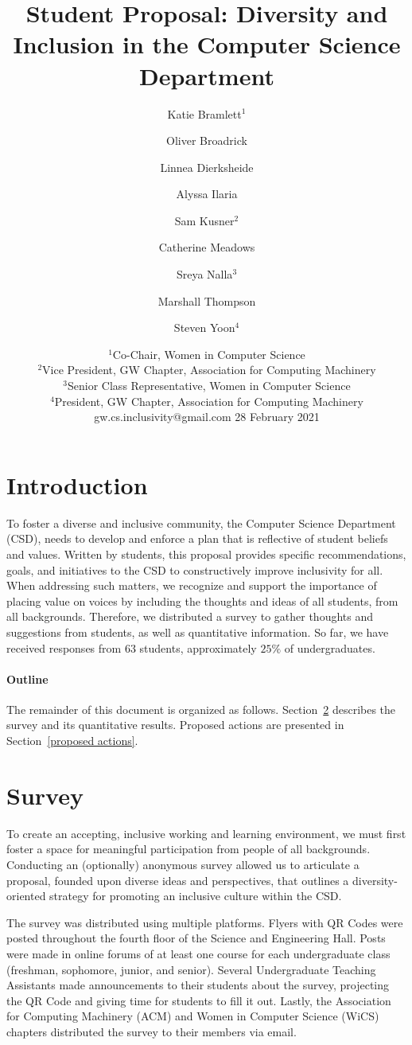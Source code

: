 \documentclass{article}
\title{Student Proposal: Diversity and Inclusion in the Computer Science Department}
\author{
Katie Bramlett$^1$\and
Oliver Broadrick\and
Linnea Dierksheide\and
Alyssa Ilaria\and
Sam Kusner$^2$\and
Catherine Meadows\and
Sreya Nalla$^3$\and
Marshall Thompson\and
Steven Yoon$^4$
}
\date{%
    $^1$Co-Chair, Women in Computer Science\\
    $^2$Vice President, GW Chapter, Association for Computing Machinery\\
    $^3$Senior Class Representative, Women in Computer Science\\
    $^4$President, GW Chapter, Association for Computing Machinery\\
    gw.cs.inclusivity@gmail.com
    28 February 2021
}
\begin{document}
\maketitle


\section{Introduction}
To foster a diverse and inclusive community, the Computer Science Department (CSD), 
needs to develop and enforce a plan that is reflective of student beliefs and values.
Written by students, this proposal
provides specific recommendations, goals, and initiatives
to the CSD to constructively improve
inclusivity for all.
When addressing such matters, we recognize and support the importance of 
placing value on voices by including the thoughts and ideas of all students, from all backgrounds.
Therefore, we distributed a survey to gather thoughts and suggestions from students, as well as 
quantitative information. So far, we have
received responses from $63$ students, approximately $25\%$ of undergraduates.

\paragraph{Outline}
The remainder of this document is organized as follows.
Section~\ref{survey} describes the survey and its quantitative results.
Proposed actions are presented in Section~\ref{proposed actions}.

\section{Survey}\label{survey}
To create an accepting, inclusive working and learning environment, we must 
first foster a space for meaningful participation from people of all backgrounds.
Conducting an (optionally) anonymous survey allowed us to articulate a proposal, 
founded upon diverse ideas and perspectives, that outlines a diversity-oriented
strategy for promoting an inclusive culture within the CSD.

The survey was distributed using multiple platforms. Flyers with QR Codes were posted
throughout the fourth floor of the Science and Engineering Hall.
Posts were made in online forums of at least one course
for each undergraduate class (freshman, sophomore, junior, and senior).
Several Undergraduate Teaching Assistants made announcements to their 
students about the survey, projecting the QR Code and giving time
for students to fill it out. Lastly, the Association for Computing Machinery (ACM) and Women 
in Computer Science (WiCS) chapters distributed the survey to their members via email. 
\end{document}
